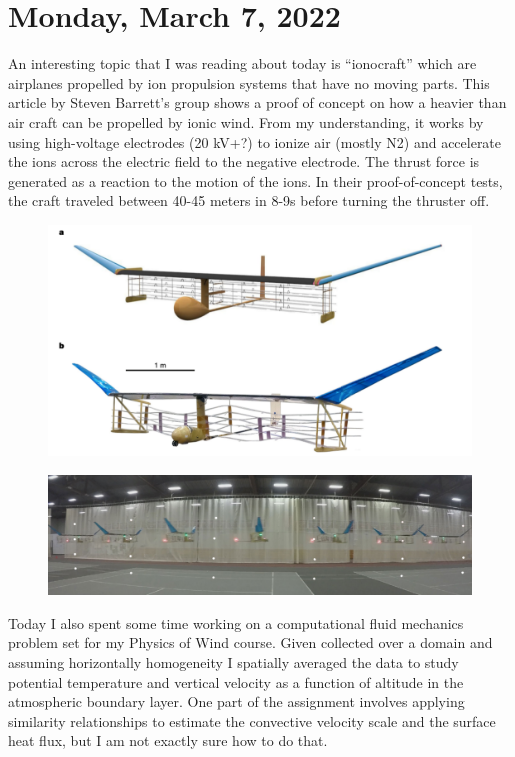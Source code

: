 \documentclass[12pt]{article}
\begin{document}
\section{Monday, March 7, 2022}
\par
An interesting topic that I was reading about today is “ionocraft” which are airplanes propelled by ion propulsion systems that have no moving parts. This article by Steven Barrett’s group shows a proof of concept on how a heavier than air craft can be propelled by ionic wind. From my understanding, it works by using high-voltage electrodes (20 kV+?) to ionize air (mostly N2) and accelerate the ions across the electric field to the negative electrode.  The thrust force is generated as a reaction to the motion of the ions. In their proof-of-concept tests, the craft traveled between 40-45 meters in 8-9s before turning the thruster off.

\begin{figure}[H]
\centering
\includegraphics[width=\linewidth]{images/ionicwindplane.pdf}
\end{figure}

\begin{figure}[H]
\centering
\includegraphics[width=\linewidth]{images/ionocraftmotion.pdf}
\end{figure}

\par
Today I also spent some time working on a computational fluid mechanics problem set for my Physics of Wind course. Given collected over a domain and assuming horizontally homogeneity I spatially averaged the data to study potential temperature and vertical velocity as a function of altitude in the atmospheric boundary layer. One part of the assignment involves applying similarity relationships to estimate the convective velocity scale and the surface heat flux, but I am not exactly sure how to do that. 
\end{document}
